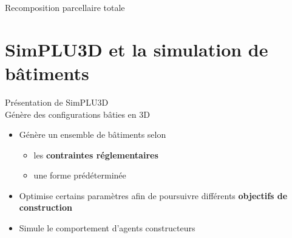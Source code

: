 \documentclass[xcolor=table]{beamer}
\begin{document}

\begin{frame}{Recomposition parcellaire totale}
\end{frame}


\section[SimPLU3D]{SimPLU3D et la simulation de bâtiments}

\begin{frame}{Présentation de SimPLU3D}
	\\
	Génère des configurations bâties en 3D
	\begin{itemize}
		\item Génère un ensemble de bâtiments selon
		\begin{itemize}
			\item les \textbf{contraintes réglementaires}
			\item une forme prédéterminée
		\end{itemize}
		\item Optimise certains paramètres afin de poursuivre différents \textbf{objectifs de construction}
		\item Simule le comportement d'agents constructeurs
	\end{itemize} 
\end{frame}
\end{document}

